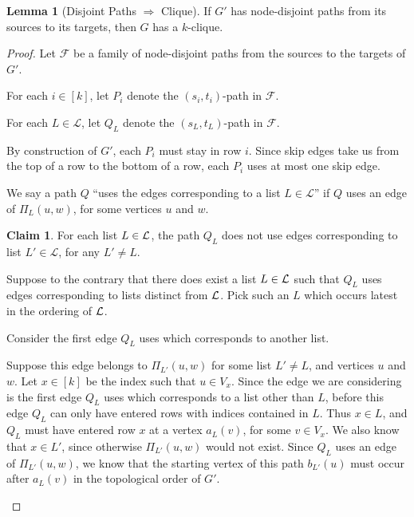 \documentclass[11pt]{article}
\newcommand{\ca}{\mathcal}
\theoremstyle{definition}
\newtheorem{lemma}[theorem]{Lemma}
\newtheorem{claim}[theorem]{Claim}
\begin{document}
    \begin{lemma}[Disjoint Paths $\Rightarrow$ Clique]
    \label{lem:dp-to-clique}
        If $G'$ has node-disjoint paths from its sources to its targets, then $G$ has a $k$-clique.
    \end{lemma}
    \begin{proof}
        Let $\ca{F}$ be a family of node-disjoint paths from the sources to the targets of $G'$.

        For each $i\in [k]$, let $P_i$ denote the $(s_i,t_i)$-path in $\ca{F}$.
        
        For each $L\in\ca{L}$, let $Q_L$ denote the $(s_L,t_L)$-path in $\ca{F}$.

        By construction of $G'$, each $P_i$ must stay in row $i$.
        Since skip edges take us from the top of a row to the bottom of a row, each $P_i$ uses at most one skip edge. 

        We say a path $Q$ ``uses the edges corresponding to a list $L\in\mathcal{L}$'' if $Q$ uses an edge of $\Pi_L(u,w)$, for some vertices $u$ and $w$.

        \begin{claim}
            \label{claim:lists-are-safe}
            For each list $L\in \cal{L}$, the path $Q_L$ does not use edges corresponding to list $L'\in\mathcal{L}$, for any $L'\neq L$.
        \end{claim}
        \begin{claimproof}
            Suppose to the contrary that there does exist a list $L\in\cal{L}$ such that $Q_L$ uses edges corresponding to lists distinct from $\cal{L}$.
            Pick such an $L$ which occurs latest in the ordering of $\cal{L}$.

            Consider the first edge $Q_L$ uses which corresponds to another list.
            
            Suppose this edge belongs to  $\Pi_{L'}(u,w)$ for some list $L'\neq L$, and vertices $u$ and $w$.
            Let $x\in [k]$ be the index such that $u\in V_x$.
            Since the edge we are considering is the first edge $Q_L$ uses which corresponds
            to a list other than $L$, before  this edge $Q_L$ can only have entered rows with indices contained in $L$.
            Thus $x\in L$, and $Q_L$ must have entered row $x$ at a vertex $a_L(v)$, for some $v\in V_x$.
            We also know that $x\in L'$, since otherwise $\Pi_{L'}(u,w)$ would not exist.
            Since $Q_L$ uses an edge of $\Pi_{L'}(u,w)$, we know that the starting vertex of this path $b_{L'}(u)$ must occur after $a_L(v)$ in the topological order of $G'$.
            

\end{claimproof}
\end{proof}
\end{document}
